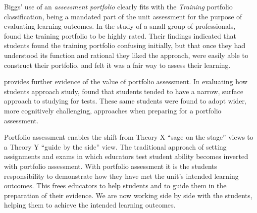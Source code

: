 Biggs' use of an \emph{assessment portfolio} clearly fits with the \emph{Training} portfolio classification, being a mandated part of the unit assessment for the purpose of evaluating learning outcomes. In the study of a small group of professionals, \citet{Smith:2001} found the training portfolio to be highly rated. Their findings indicated that students found the training portfolio confusing initially, but that once they had understood its function and rational they liked the approach, were easily able to construct their portfolio, and felt it was a fair way to assess their learning.

\citet{Tang:1999} provides further evidence of the value of portfolio assessment. In evaluating how students approach study, \citet{Tang:1999} found that students tended to have a narrow, surface approach to studying for tests. These same students were found to adopt wider, more cognitively challenging, approaches when preparing for a portfolio assessment. 

Portfolio assessment enables the shift from Theory X ``sage on the stage'' views to a Theory Y ``guide by the side'' view. The traditional approach of setting assignments and exams in which educators test student ability becomes inverted with portfolio assessment. With portfolio assessment it is the students responsibility to demonstrate how they have met the unit's intended learning outcomes. This frees educators to help students and to guide them in the preparation of their evidence. We are now working side by side with the students, helping them to achieve the intended learning outcomes.

